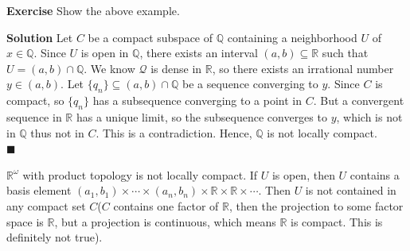 \documentclass[main.tex]{subfiles}
\begin{document}
\par \noindent \textbf{Exercise} Show the above example. 
\par \noindent \textbf{Solution} Let $C$ be a compact subspace of $\mathbb{Q}$ containing a neighborhood $U$ of $x \in \mathbb{Q}$. Since $U$ is open in $\mathbb{Q}$, there exists an interval $(a, b) \subseteq \mathbb{R}$ such that $U = (a, b) \cap \mathbb{Q}$. We know $\mathcal{Q}$ is dense in $\mathbb{R}$, so there exists an irrational number $y \in (a, b)$. Let $\{q_n\} \subseteq (a, b) \cap \mathbb{Q}$ be a sequence converging to $y$. Since $C$ is compact, so $\{q_n\}$ has a subsequence converging to a point in $C$. But a convergent sequence in $\mathbb{R}$ has a unique limit, so the subsequence converges to $y$, which is not in $\mathbb{Q}$ thus not in $C$. This is a contradiction. Hence, $\mathbb{Q}$ is not locally compact.
\mbox{} \\ \null \hfill $\blacksquare$ 

\begin{example}
    $\mathbb{R}^{\omega}$ with product topology is not locally compact. If $U$ is open, then $U$ contains a basis element $(a_1, b_1) \times \cdots \times (a_n, b_n) \times \mathbb{R} \times \mathbb{R} \times \cdots$. Then $U$ is not contained in any compact set $C$($C$ contains one factor of $\mathbb{R}$, then the projection to some factor space is $\mathbb{R}$, but a projection is continuous, which means $\mathbb{R}$ is compact. This is definitely not true). 
\end{example}
\end{document}
